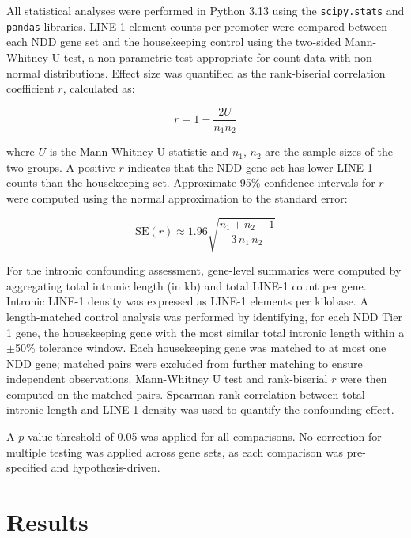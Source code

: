 \documentclass[11pt, a4paper]{article}
\begin{document}
All statistical analyses were performed in Python 3.13 using
the \texttt{scipy.stats} and \texttt{pandas} libraries.
LINE-1 element counts per promoter were compared between
each NDD gene set and the housekeeping control using the
two-sided Mann-Whitney U test, a non-parametric test
appropriate for count data with non-normal distributions.
Effect size was quantified as the rank-biserial correlation
coefficient $r$, calculated as:

\begin{equation}
r = 1 - \frac{2U}{n_1 n_2}
\end{equation}

\noindent where $U$ is the Mann-Whitney U statistic and $n_1$,
$n_2$ are the sample sizes of the two groups. A positive $r$
indicates that the NDD gene set has lower LINE-1 counts than
the housekeeping set. Approximate 95\% confidence intervals for $r$ were computed
using the normal approximation to the standard error:

\begin{equation}
\mathrm{SE}(r) \approx 1.96 \sqrt{\frac{n_1 + n_2 + 1}{3\,n_1\,n_2}}
\end{equation}

For the intronic confounding assessment, gene-level summaries
were computed by aggregating total intronic length (in kb) and
total LINE-1 count per gene. Intronic LINE-1 density was
expressed as LINE-1 elements per kilobase. A length-matched
control analysis was performed by identifying, for each NDD Tier
1 gene, the housekeeping gene with the most similar total
intronic length within a $\pm$50\% tolerance window. Each housekeeping gene was matched to at most one NDD gene; matched pairs were excluded from further matching to ensure independent observations. Mann-Whitney U test and rank-biserial
$r$ were then computed on the matched pairs. Spearman rank
correlation between total intronic length and LINE-1 density
was used to quantify the confounding effect.

A $p$-value threshold of 0.05 was applied for all comparisons.
No correction for multiple testing was applied across gene
sets, as each comparison was pre-specified and hypothesis-driven.

\section*{Results}
\end{document}
